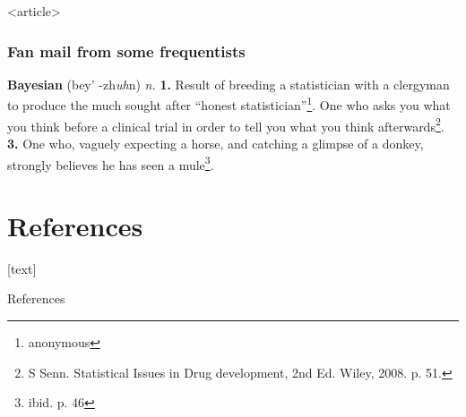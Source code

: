 \documentclass{beamer}
\begin{document}
\begin{frame}<article>
  \frametitle{Fan mail from some frequentists}

\begin{minipage}{\textwidth}
{\bf Bayesian} (bey' -zh{\it uh}n) {\it n.} {\bf 1.} Result of
breeding a statistician with a clergyman to produce the much sought
after ``honest statistician''\footnote{anonymous}.   One who asks you what you think before a clinical trial in order to tell you what you think afterwards\footnote{S Senn. Statistical Issues in Drug development, 2nd Ed. Wiley, 2008. p. 51.}. {\bf 3.} One who, vaguely expecting a horse, and catching a glimpse of a donkey, strongly believes he has seen a mule\footnote{ibid. p. 46}.
\end{minipage}
\vspace{3in}

\end{frame}

\nocite{}

\section{References}

[text]

\begin{frame}[allowframebreaks]{References}

\scriptsize



\end{frame}


  
\end{document}
